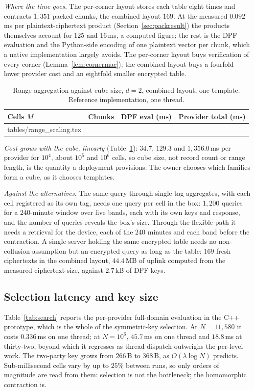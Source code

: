 \documentclass[a4paper,fleqn]{cas-sc}
\begin{document}
\emph{Where the time goes.} The per-corner layout stores each table eight times
and contracts $1{,}351$ packed chunks, the combined layout $169$. At the
measured $0.092$\,ms per plaintext-ciphertext product (Section~\ref{sec:packresult})
the products themselves account for $125$ and $16$\,ms, a computed figure; the
rest is the DPF evaluation and the Python-side encoding of one plaintext
vector per chunk, which a native implementation largely avoids. The per-corner
layout buys verification of every corner (Lemma~\ref{lem:cornermac}); the
combined layout buys a fourfold lower provider cost and an eightfold smaller
encrypted table.

\begin{table}[pos=htbp]
\caption{Range aggregation against cube size, $d=2$, combined layout, one
template. Reference implementation, one thread.}
\label{tab:rangescale}
\centering
\footnotesize
\begin{tabular*}{\tblwidth}{@{\extracolsep{\fill}}lccc@{}}
\toprule
Cells $M$ & Chunks & DPF eval (ms) & Provider total (ms) \\
\midrule
{} tables/range_scaling.tex 
\bottomrule
\end{tabular*}
\end{table}

\emph{Cost grows with the cube, linearly} (Table~\ref{tab:rangescale}): $34.7$,
$129.3$ and $1{,}356.0$\,ms per provider for $10^4$, about $10^5$ and $10^6$
cells, so cube size, not record count or range length, is the quantity a
deployment provisions. The owner chooses which families form a cube, as it
chooses templates.

\emph{Against the alternatives.} The same query through single-tag aggregates,
with each cell registered as its own tag, needs one query per cell in the box:
$1{,}200$ queries for a $240$-minute window over five bands, each with its own
keys and response, and the number of queries reveals the box's size. Through
the flexible path it needs a retrieval for the device, each of the $240$
minutes and each band before the contraction. A single server holding the same
encrypted table needs no non-collusion assumption but an encrypted query as long
as the table: $169$ fresh ciphertexts in the combined layout, $44.4$\,MB of
uplink computed from the measured ciphertext size, against $2.7$\,kB of DPF
keys.

\subsection{Selection latency and key size}
Table~\ref{tab:search} reports the per-provider full-domain evaluation in the
C++ prototype, which is the whole of the symmetric-key selection. At
$N=11{,}580$ it costs $0.336$\,ms on one thread; at $N=10^6$, $45.7$\,ms on one
thread and $18.8$\,ms at thirty-two, beyond which it regresses as thread
dispatch outweighs the per-level work. The two-party key grows from $266$\,B to
$368$\,B, as $O(\lambda\log N)$ predicts. Sub-millisecond cells vary by up to
$25\%$ between runs, so only orders of magnitude are read from them: selection
is not the bottleneck; the homomorphic contraction is.
\end{document}
